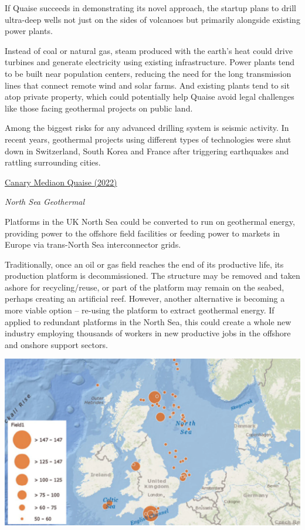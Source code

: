 \documentclass[
]{book}
\begin{document}
If Quaise succeeds in demonstrating its novel approach, the startup plans to drill ultra-deep wells not just on the sides of volcanoes but primarily alongside existing power plants.

Instead of coal or natural gas, steam produced with the earth's heat could drive turbines and generate electricity using existing infrastructure. Power plants tend to be built near population centers, reducing the need for the long transmission lines that connect remote wind and solar farms. And existing plants tend to sit atop private property, which could potentially help Quaise avoid legal challenges like those facing geothermal projects on public land.

Among the biggest risks for any advanced drilling system is seismic activity. In recent years, geothermal projects using different types of technologies were shut down in Switzerland, South Korea and France after triggering earthquakes and rattling surrounding cities.

\href{https://www.canarymedia.com/articles/geothermal/geothermal-startup-quaise-raises-40m-for-ultra-deep-drilling}{Canary Mediaon Quaise (2022)}

\emph{North Sea Geothermal}

Platforms in the UK North Sea could be converted to run on geothermal energy, providing power to the offshore field facilities or feeding power to markets in Europe via trans-North Sea interconnector grids.

Traditionally, once an oil or gas field reaches the end of its productive life, its production platform is decommissioned. The structure may be removed and taken ashore for recycling/reuse, or part of the platform may remain on the seabed, perhaps creating an artificial reef. However, another alternative is becoming a more viable option -- re-using the platform to extract geothermal energy. If applied to redundant platforms in the North Sea, this could create a whole new industry employing thousands of workers in new productive jobs in the offshore and onshore support sectors.

\includegraphics{fig/North_Sea_UK_geothermal.png}
\end{document}
